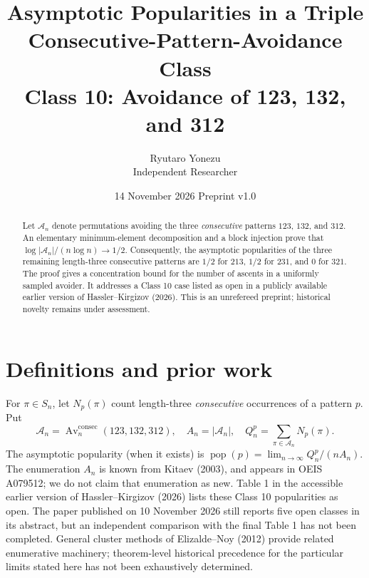 \documentclass[11pt]{article}
\title{Asymptotic Popularities in a Triple Consecutive-Pattern-Avoidance Class\\[4pt]\large Class 10: Avoidance of 123, 132, and 312}
\author{Ryutaro Yonezu\\Independent Researcher}
\date{14 November 2026 \quad Preprint v1.0}
\newcommand{\Av}{\mathcal{A}}
\begin{document}
\maketitle
\begin{abstract}
Let $\mathcal{A}_n$ denote permutations avoiding the three \emph{consecutive} patterns $123$, $132$, and $312$. An elementary minimum-element decomposition and a block injection prove that $\log|\mathcal{A}_n|/(n\log n)\to 1/2$. Consequently, the asymptotic popularities of the three remaining length-three consecutive patterns are $1/2$ for $213$, $1/2$ for $231$, and $0$ for $321$. The proof gives a concentration bound for the number of ascents in a uniformly sampled avoider. It addresses a Class 10 case listed as open in a publicly available earlier version of Hassler--Kirgizov (2026). This is an unrefereed preprint; historical novelty remains under assessment.
\end{abstract}

\section{Definitions and prior work}
For $\pi\in S_n$, let $N_p(\pi)$ count length-three \emph{consecutive} occurrences of a pattern $p$. Put
\[
\Av_n=\operatorname{Av}^{\mathrm{consec}}_n(123,132,312), \quad
A_n=|\Av_n|,\quad Q^p_n=\sum_{\pi\in\Av_n}N_p(\pi).
\]
The asymptotic popularity (when it exists) is $\operatorname{pop}(p)=\lim_{n\to\infty}Q_n^p/(nA_n)$. The enumeration $A_n$ is known from Kitaev (2003), and appears in OEIS A079512; we do not claim that enumeration as new. Table 1 in the accessible earlier version of Hassler--Kirgizov (2026) lists these Class 10 popularities as open. The paper published on 10 November 2026 still reports five open classes in its abstract, but an independent comparison with the final Table 1 has not been completed. General cluster methods of Elizalde--Noy (2012) provide related enumerative machinery; theorem-level historical precedence for the particular limits stated here has not been exhaustively determined.
\end{document}
